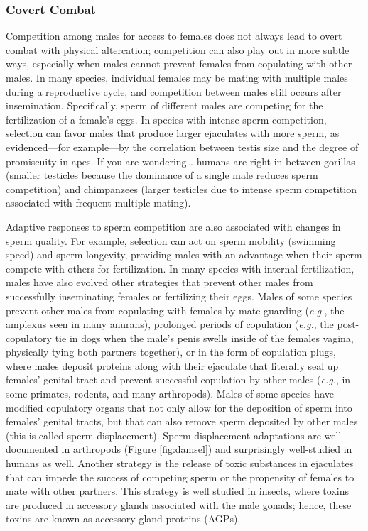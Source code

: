 \documentclass[
]{book}
\begin{document}
\hypertarget{covert-combat}{%
\subsubsection*{Covert Combat}\label{covert-combat}}

Competition among males for access to females does not always lead to overt combat with physical altercation; competition can also play out in more subtle ways, especially when males cannot prevent females from copulating with other males. In many species, individual females may be mating with multiple males during a reproductive cycle, and competition between males still occurs after insemination. Specifically, sperm of different males are competing for the fertilization of a female's eggs. In species with intense sperm competition, selection can favor males that produce larger ejaculates with more sperm, as evidenced---for example---by the correlation between testis size and the degree of promiscuity in apes. If you are wondering\ldots{} humans are right in between gorillas (smaller testicles because the dominance of a single male reduces sperm competition) and chimpanzees (larger testicles due to intense sperm competition associated with frequent multiple mating).

Adaptive responses to sperm competition are also associated with changes in sperm quality. For example, selection can act on sperm mobility (swimming speed) and sperm longevity, providing males with an advantage when their sperm compete with others for fertilization. In many species with internal fertilization, males have also evolved other strategies that prevent other males from successfully inseminating females or fertilizing their eggs. Males of some species prevent other males from copulating with females by mate guarding (\emph{e.g.}, the amplexus seen in many anurans), prolonged periods of copulation (\emph{e.g.}, the post-copulatory tie in dogs when the male's penis swells inside of the females vagina, physically tying both partners together), or in the form of copulation plugs, where males deposit proteins along with their ejaculate that literally seal up females' genital tract and prevent successful copulation by other males (\emph{e.g.}, in some primates, rodents, and many arthropods). Males of some species have modified copulatory organs that not only allow for the deposition of sperm into females' genital tracts, but that can also remove sperm deposited by other males (this is called sperm displacement). Sperm displacement adaptations are well documented in arthropods (Figure \ref{fig:damsel}) and surprisingly well-studied in humans as well. Another strategy is the release of toxic substances in ejaculates that can impede the success of competing sperm or the propensity of females to mate with other partners. This strategy is well studied in insects, where toxins are produced in accessory glands associated with the male gonads; hence, these toxins are known as accessory gland proteins (AGPs).
\end{document}
